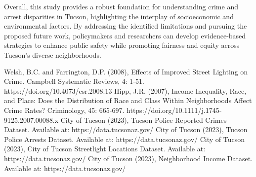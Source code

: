 \documentclass{report}
\begin{document}
Overall, this study provides a robust foundation for understanding crime and arrest disparities in Tucson, highlighting the interplay of socioeconomic and environmental factors. By addressing the identified limitations and pursuing the proposed future work, policymakers and researchers can develop evidence-based strategies to enhance public safety while promoting fairness and equity across Tucson's diverse neighborhoods.


\begin{thebibliography}{9}
  Welsh, B.C. and Farrington, D.P. (2008), Effects of Improved Street Lighting on Crime. Campbell Systematic Reviews, 4: 1-51. https://doi.org/10.4073/csr.2008.13
  Hipp, J.R. (2007), Income Inequality, Race, and Place: Does the Distribution of Race and Class Within Neighborhoods Affect Crime Rates? Criminology, 45: 665-697. https://doi.org/10.1111/j.1745-9125.2007.00088.x
  City of Tucson (2023), Tucson Police Reported Crimes Dataset. Available at: https://data.tucsonaz.gov/
  City of Tucson (2023), Tucson Police Arrests Dataset. Available at: https://data.tucsonaz.gov/
  City of Tucson (2023), City of Tucson Streetlight Locations Dataset. Available at: https://data.tucsonaz.gov/
  City of Tucson (2023), Neighborhood Income Dataset. Available at: https://data.tucsonaz.gov/
\end{thebibliography}
\end{document}
